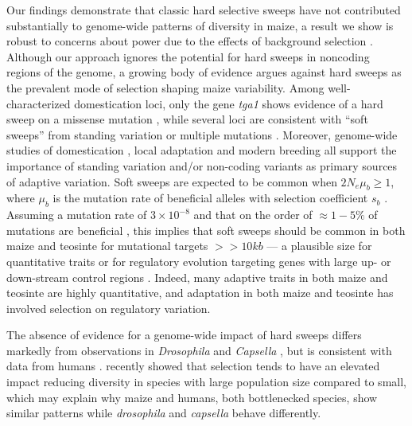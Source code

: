 \documentclass{pnastwo}
\newcommand{\jri}[1]{\textcolor{red}{\scriptsize #1}}
\begin{document}
\begin{article}
Our findings demonstrate that classic hard selective sweeps have not contributed substantially to genome-wide patterns of diversity in maize, a result we show is robust to concerns about power due to the effects of background selection  \cite{enard2014}. 
Although our approach ignores the potential for hard sweeps in noncoding regions of the genome, a growing body of evidence argues against hard sweeps as the prevalent mode of selection shaping maize variability. 
Among well-characterized domestication loci, only the gene \emph{tga1} shows evidence of a hard sweep on a missense mutation \cite{wang2015}, while several loci are consistent with ``soft sweeps''  from standing variation \cite{studer2011,gallavotti2004role} or multiple mutations \cite{wills2013}. 
Moreover, genome-wide studies of domestication \cite{hufford2012},  local adaptation \cite{Takuno15062015} and modern breeding \cite{beissinger2014} all support the importance of standing variation and/or non-coding variants as primary sources of adaptive variation. 
Soft sweeps are expected to be common when $2N_e\mu_b \ge 1$, where $\mu_b$ is the mutation rate of beneficial alleles with selection coefficient $s_b$ \cite{messer2013population}. Assuming a mutation rate of $3 \times 10^{-8}$ \cite{clark2005} and that on the order of $\approx 1-5\%$ of mutations are beneficial \cite{eyre2007distribution}, this implies that soft sweeps should be common in both maize and teosinte for mutational targets $>>10kb$ --- a plausible size for quantitative traits or for regulatory evolution targeting genes with large up- or down-stream control regions \cite[e.g.]{studer2011}.
Indeed, many adaptive traits in both maize \cite{wallace2014} and teosinte \cite{weber2008} are highly quantitative,  and adaptation in both maize \cite{hufford2012} and teosinte \cite{pyhajarvi2013complex} has involved selection on regulatory variation.

The absence of evidence for a genome-wide impact of hard sweeps differs markedly from observations in \emph{Drosophila} \cite{sattath2011} and \emph{Capsella} \cite{williamson2014}, but is consistent with data from humans \cite{hernandez2011,pritchard2010genetics}. \cite{corbett2015} recently showed that selection tends to have an elevated impact reducing diversity in species with large population size compared to small, which may explain why maize and humans, both bottlenecked species, show similar patterns while \emph{drosophila} and \emph{capsella} behave differently.



\end{article}
\end{document}
